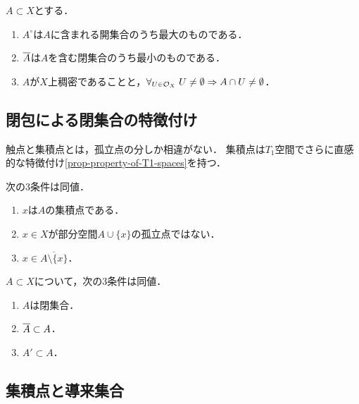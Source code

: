 \documentclass[uplatex,dvipdfmx]{jsreport}
\begin{document}
\begin{proposition}[開核，閉包，稠密性の特徴付け]
    $A\subset X$とする．
    \begin{enumerate}
        \item $A^\circ$は$A$に含まれる開集合のうち最大のものである．
        \item $\overline{A}$は$A$を含む閉集合のうち最小のものである．
        \item $A$が$X$上稠密であることと，$\forall_{U\in\mathcal{O}_X}\;U\ne\emptyset\Rightarrow A\cap U\ne\emptyset$．
    \end{enumerate}
\end{proposition}

\subsection{閉包による閉集合の特徴付け}

\begin{tcolorbox}[colframe=ForestGreen, colback=ForestGreen!10!white,breakable,colbacktitle=ForestGreen!40!white,coltitle=black,fonttitle=\bfseries\sffamily,
title=]
    触点と集積点とは，孤立点の分しか相違がない．
    集積点は$T_1$空間でさらに直感的な特徴付け\ref{prop-property-of-T1-spaces}を持つ．
\end{tcolorbox}

\begin{proposition}[集積点の特徴付け]
    次の3条件は同値．
    \begin{enumerate}
        \item $x$は$A$の集積点である．
        \item $x\in X$が部分空間$A\cup\{x\}$の孤立点ではない．
        \item $x\in\overline{A\setminus\{x\}}$．
    \end{enumerate}
\end{proposition}

\begin{proposition}
    $A\subset X$について，次の3条件は同値．
    \begin{enumerate}
        \item $A$は閉集合．
        \item $\overline{A}\subset A$．
        \item $A'\subset A$．
    \end{enumerate}
\end{proposition}

\subsection{集積点と導来集合}
\end{document}
